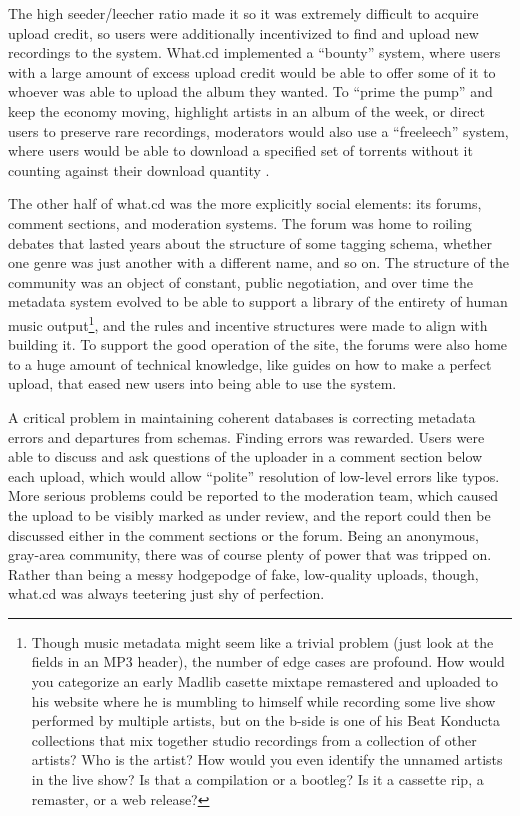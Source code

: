 \documentclass[10pt]{article}
\begin{document}
\begin{multicols}{2}
The high seeder/leecher ratio made it so it was extremely difficult to
acquire upload credit, so users were additionally incentivized to find
and upload new recordings to the system. What.cd implemented a
``bounty'' system, where users with a large amount of excess upload
credit would be able to offer some of it to whoever was able to upload
the album they wanted. To ``prime the pump'' and keep the economy
moving, highlight artists in an album of the week, or direct users to
preserve rare recordings, moderators would also use a ``freeleech''
system, where users would be able to download a specified set of
torrents without it counting against their download quantity \cite{kashEconomicsBitTorrentCommunities2012, chenImprovingSustainabilityPrivate2011a} .

The other half of what.cd was the more explicitly social elements: its
forums, comment sections, and moderation systems. The forum was home to
roiling debates that lasted years about the structure of some tagging
schema, whether one genre was just another with a different name, and so
on. The structure of the community was an object of constant, public
negotiation, and over time the metadata system evolved to be able to
support a library of the entirety of human music output\footnote{Though
  music metadata might seem like a trivial problem (just look at the
  fields in an MP3 header), the number of edge cases are profound. How
  would you categorize an early Madlib casette mixtape remastered and
  uploaded to his website where he is mumbling to himself while
  recording some live show performed by multiple artists, but on the
  b-side is one of his Beat Konducta collections that mix together
  studio recordings from a collection of other artists? Who is the
  artist? How would you even identify the unnamed artists in the live
  show? Is that a compilation or a bootleg? Is it a cassette rip, a
  remaster, or a web release?}, and the rules and incentive structures
were made to align with building it. To support the good operation of
the site, the forums were also home to a huge amount of technical
knowledge, like guides on how to make a perfect upload, that eased new
users into being able to use the system.

A critical problem in maintaining coherent databases is correcting
metadata errors and departures from schemas. Finding errors was
rewarded. Users were able to discuss and ask questions of the uploader
in a comment section below each upload, which would allow ``polite''
resolution of low-level errors like typos. More serious problems could
be reported to the moderation team, which caused the upload to be
visibly marked as under review, and the report could then be discussed
either in the comment sections or the forum. Being an anonymous,
gray-area community, there was of course plenty of power that was
tripped on. Rather than being a messy hodgepodge of fake, low-quality
uploads, though, what.cd was always teetering just shy of perfection.


\end{multicols}
\end{document}
